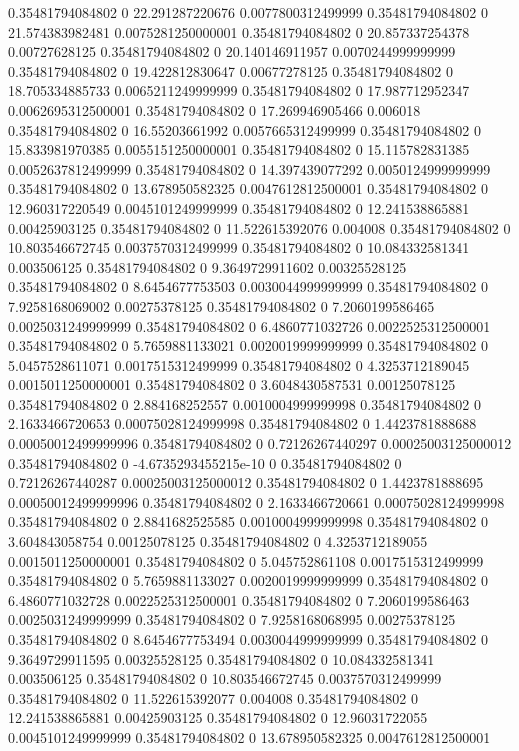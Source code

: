 0.35481794084802 0 22.291287220676 0.0077800312499999
0.35481794084802 0 21.574383982481 0.0075281250000001
0.35481794084802 0 20.857337254378 0.00727628125
0.35481794084802 0 20.140146911957 0.0070244999999999
0.35481794084802 0 19.422812830647 0.00677278125
0.35481794084802 0 18.705334885733 0.0065211249999999
0.35481794084802 0 17.987712952347 0.0062695312500001
0.35481794084802 0 17.269946905466 0.006018
0.35481794084802 0 16.55203661992 0.0057665312499999
0.35481794084802 0 15.833981970385 0.0055151250000001
0.35481794084802 0 15.115782831385 0.0052637812499999
0.35481794084802 0 14.397439077292 0.0050124999999999
0.35481794084802 0 13.678950582325 0.0047612812500001
0.35481794084802 0 12.960317220549 0.0045101249999999
0.35481794084802 0 12.241538865881 0.00425903125
0.35481794084802 0 11.522615392076 0.004008
0.35481794084802 0 10.803546672745 0.0037570312499999
0.35481794084802 0 10.084332581341 0.003506125
0.35481794084802 0 9.3649729911602 0.00325528125
0.35481794084802 0 8.6454677753503 0.0030044999999999
0.35481794084802 0 7.9258168069002 0.00275378125
0.35481794084802 0 7.2060199586465 0.0025031249999999
0.35481794084802 0 6.4860771032726 0.0022525312500001
0.35481794084802 0 5.7659881133021 0.0020019999999999
0.35481794084802 0 5.0457528611071 0.0017515312499999
0.35481794084802 0 4.3253712189045 0.0015011250000001
0.35481794084802 0 3.6048430587531 0.00125078125
0.35481794084802 0 2.884168252557 0.0010004999999998
0.35481794084802 0 2.1633466720653 0.00075028124999998
0.35481794084802 0 1.4423781888688 0.00050012499999996
0.35481794084802 0 0.72126267440297 0.00025003125000012
0.35481794084802 0 -4.6735293455215e-10 0
0.35481794084802 0 0.72126267440287 0.00025003125000012
0.35481794084802 0 1.4423781888695 0.00050012499999996
0.35481794084802 0 2.1633466720661 0.00075028124999998
0.35481794084802 0 2.8841682525585 0.0010004999999998
0.35481794084802 0 3.604843058754 0.00125078125
0.35481794084802 0 4.3253712189055 0.0015011250000001
0.35481794084802 0 5.045752861108 0.0017515312499999
0.35481794084802 0 5.7659881133027 0.0020019999999999
0.35481794084802 0 6.4860771032728 0.0022525312500001
0.35481794084802 0 7.2060199586463 0.0025031249999999
0.35481794084802 0 7.9258168068995 0.00275378125
0.35481794084802 0 8.6454677753494 0.0030044999999999
0.35481794084802 0 9.3649729911595 0.00325528125
0.35481794084802 0 10.084332581341 0.003506125
0.35481794084802 0 10.803546672745 0.0037570312499999
0.35481794084802 0 11.522615392077 0.004008
0.35481794084802 0 12.241538865881 0.00425903125
0.35481794084802 0 12.96031722055 0.0045101249999999
0.35481794084802 0 13.678950582325 0.0047612812500001
